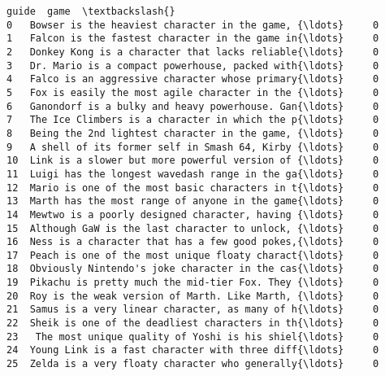 \documentclass[11pt]{article}
\begin{document}
\begin{tcolorbox}[breakable, size=fbox, boxrule=.5pt, pad at break*=1mm, opacityfill=0]
\begin{Verbatim}[commandchars=\\\{\}]
                                                guide  game  \textbackslash{}
0   Bowser is the heaviest character in the game, {\ldots}     0
1   Falcon is the fastest character in the game in{\ldots}     0
2   Donkey Kong is a character that lacks reliable{\ldots}     0
3   Dr. Mario is a compact powerhouse, packed with{\ldots}     0
4   Falco is an aggressive character whose primary{\ldots}     0
5   Fox is easily the most agile character in the {\ldots}     0
6   Ganondorf is a bulky and heavy powerhouse. Gan{\ldots}     0
7   The Ice Climbers is a character in which the p{\ldots}     0
8   Being the 2nd lightest character in the game, {\ldots}     0
9   A shell of its former self in Smash 64, Kirby {\ldots}     0
10  Link is a slower but more powerful version of {\ldots}     0
11  Luigi has the longest wavedash range in the ga{\ldots}     0
12  Mario is one of the most basic characters in t{\ldots}     0
13  Marth has the most range of anyone in the game{\ldots}     0
14  Mewtwo is a poorly designed character, having {\ldots}     0
15  Although GaW is the last character to unlock, {\ldots}     0
16  Ness is a character that has a few good pokes,{\ldots}     0
17  Peach is one of the most unique floaty charact{\ldots}     0
18  Obviously Nintendo's joke character in the cas{\ldots}     0
19  Pikachu is pretty much the mid-tier Fox. They {\ldots}     0
20  Roy is the weak version of Marth. Like Marth, {\ldots}     0
21  Samus is a very linear character, as many of h{\ldots}     0
22  Sheik is one of the deadliest characters in th{\ldots}     0
23   The most unique quality of Yoshi is his shiel{\ldots}     0
24  Young Link is a fast character with three diff{\ldots}     0
25  Zelda is a very floaty character who generally{\ldots}     0


\end{Verbatim}
\end{tcolorbox}
\end{document}

